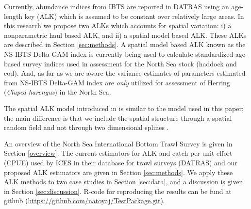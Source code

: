 \documentclass[a4paper 12pt]{article}
\numberwithin{equation}{section}
\begin{document}
Currently, abundance indices from IBTS are reported in DATRAS \citep{datras} using an age-length key (ALK) \citep{fridriksson1934calculation} which is assumed to be constant over relatively large areas. In this research we propose two ALKs which accounts for spatial variation: i) a nonparametric  haul based ALK, and ii) a spatial model based ALK. These ALKs are described in Section \ref{sec:methods}. %
A spatial model based ALK \citep{berg2012spatial, berg2014evaluation} known as the NS-IBTS Delta-GAM index \citep{ICES2016b} is currently being used to calculate standardized age-based survey indices used in assessment for the North Sea stock (haddock and cod). And, as far as we are aware the variance estimates of parameters estimated from NS-IBTS Delta-GAM index  are \textit{only} utilized for assessment of Herring (\textit{Clupea harengus}) in the North Sea.

The spatial ALK model introduced in \citet{berg2012spatial} is similar to the model used in this paper; the main difference is that we include the spatial structure through a spatial random field \citep{lindgren2011explicit} and not through two dimensional splines \citep{wood2017generalized}.

 An  overview of the  North Sea International Bottom Trawl Survey is given in Section \ref{overview}. The current estimators for ALK and catch per unit effort (CPUE) used by ICES in their database for trawl surveys (DATRAS) and our proposed ALK estimators are given in Section \ref{sec:methods}. We apply these ALK methods to two case studies in Section  \ref{sec:data}, and a discussion is given in Section \ref{sec:discussion}.
R-code for reproducing the results can be fund at github (\href{https://github.com/natoyaj/TestPackage.git}{https://github.com/natoyaj/TestPackage.git}).
 
\end{document}
